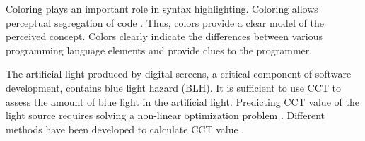 \documentclass{article}
\begin{document}
Coloring plays an important role in syntax highlighting. Coloring allows perceptual segregation of code \cite{hannebauer2018does}. Thus, colors provide a clear model of the perceived concept. Colors clearly indicate the differences between various programming language elements and provide clues to the programmer.

The artificial light produced by digital screens, a critical component of software development, contains blue light hazard (BLH). It is sufficient to use CCT to assess the amount of blue light in the artificial light. Predicting CCT value of the light source requires solving a non-linear optimization problem \cite{li2016}. Different methods have been developed to calculate CCT value \cite{robertson1968computation, xingzhong1987formulas,  mccamy1993correlated, hernandez1999calculating, li2016, ohno2014practical, davis2020correlated}.
\end{document}
